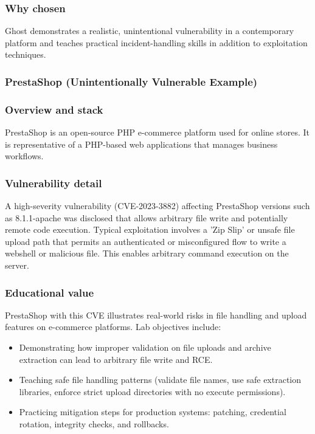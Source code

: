 \documentclass[12pt]{article}
\begin{document}
\subsubsection*{Why chosen}
Ghost demonstrates a realistic, unintentional vulnerability in a contemporary platform and teaches practical incident-handling skills in addition to exploitation techniques.

\subsubsection{PrestaShop (Unintentionally Vulnerable Example)}

\subsubsection*{Overview and stack}
PrestaShop is an open-source PHP e-commerce platform used for online stores. It is representative of a PHP-based web applications that manages business workflows.

\subsubsection*{Vulnerability detail}	
A high-severity vulnerability (CVE-2023-3882) affecting PrestaShop versions such as 8.1.1-apache was disclosed that allows arbitrary file write and potentially remote code execution. Typical exploitation involves a 'Zip Slip' or unsafe file upload path that permits an authenticated or misconfigured flow to write a webshell or malicious file. This enables arbitrary command execution on the server.

\subsubsection*{Educational value}
PrestaShop with this CVE illustrates real-world risks in file handling and upload features on e-commerce platforms. Lab objectives include:
\begin{itemize}
    \item Demonstrating how improper validation on file uploads and archive extraction can lead to arbitrary file write and RCE.
    \item Teaching safe file handling patterns (validate file names, use safe extraction libraries, enforce strict upload directories with no execute permissions).
    \item Practicing mitigation steps for production systems: patching, credential rotation, integrity checks, and rollbacks.
\end{itemize}
\end{document}
